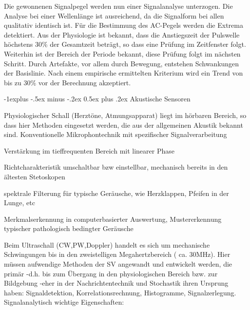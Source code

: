 \documentclass[a4paper]{article}
\makeatletter
\renewcommand{\subsection}{\@startsection{subsection}{2}{0mm}%
 {-1explus -.5ex minus -.2ex}%
 {0.5ex plus .2ex}%
 {\normalfont\normalsize\bfseries}}
\makeatother
\begin{document}
\begin{multicols}{3}
\begin{itemize*}
    \begin{itemize*}
      \item Die gewonnenen Signalpegel werden nun einer Signalanalyse unterzogen. Die Analyse bei einer Wellenlänge ist ausreichend, da die Signalform bei allen qualitativ identisch ist. Für die Bestimmung des AC-Pegels werden die Extrema detektiert. Aus der Physiologie ist bekannt, dass die Anstiegszeit der Pulswelle höchstens 30\% der Gesamtzeit beträgt, so dass eine Prüfung im Zeitfenster folgt. Weiterhin ist der Bereich der Periode bekannt, diese Prüfung folgt im nächsten Schritt. Durch Artefakte, vor allem durch Bewegung, entstehen Schwankungen der Basislinie. Nach einem empirische ermittelten Kriterium wird ein Trend von bis zu 30\% vor der Berechnung akzeptiert.
    \end{itemize*}
  \end{itemize*}

  \subsection{Akustische Sensoren}\label{akustische-sensoren}

  Physiologischer Schall (Herztöne, Atmungsapparat) liegt im hörbaren
  Bereich, so dass hier Methoden eingesetzt werden, die aus der
  allgemeinen Akustik bekannt sind. Konventionelle Mikrophontechnik mit
  spezifischer Signalverarbeitung

  \begin{itemize*}
    \item Verstärkung im tieffrequenten Bereich mit linearer Phase
    \item Richtcharakteristik umschaltbar bzw einstellbar, mechanisch bereits in den ältesten Stetoskopen
    \item spektrale Filterung für typische Geräusche, wie Herzklappen, Pfeifen in der Lunge, etc
    \item Merkmalserkennung in computerbasierter Auswertung, Mustererkennung typischer pathologisch bedingter Geräusche
  \end{itemize*}

  Beim Ultraschall (CW,PW,Doppler) handelt es sich um mechanische
  Schwingungen bis in den zweistelligen Megahertzbereich ( ca. 30MHz).
  Hier müssen aufwendige Methoden der SV angewandt und entwickelt werden,
  die primär -d.h. bis zum Übergang in den physiologischen Bereich bzw.
  zur Bildgebung -eher in der Nachrichtentechnik und Stochastik ihren
  Ursprung haben: Signaldetektion, Korrelationsrechnung, Histogramme,
  Signalzerlegung. Signalanalytisch wichtige Eigenschaften:


\end{multicols}
\end{document}
